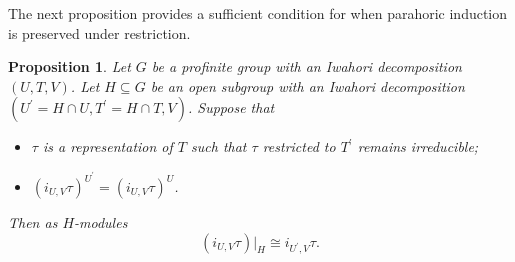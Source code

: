 \documentclass[10pt, letterpaper]{amsart}
\theoremstyle{plain}
\newtheorem{Prop}[equation]{Proposition}
\theoremstyle{definition}
\numberwithin{equation}{section}
\begin{document}
The next proposition provides a sufficient condition for when parahoric induction is preserved under restriction. 

\begin{Prop}\label{ResGamma1}
	Let $G$ be a profinite group with an Iwahori decomposition $(U,T,V)$. Let $H\subseteq G$ be an open subgroup with an Iwahori decomposition $(U^{\prime}=H\cap U,T^{\prime}=H\cap T,V)$. Suppose that 
	\begin{itemize}
		\item $\tau$ is a representation of $T$ such that $\tau$ restricted to $T^{\prime}$ remains irreducible;
		\item $(i_{U,V}\tau)^{U^{\prime}}=(i_{U,V}\tau)^{U}$.
	\end{itemize}
	
	Then as $H$-modules
    \[
    (i_{U,V}\tau)|_H\cong  i_{U^{\prime},V}\tau.
    \]

\end{Prop}
\end{document}
